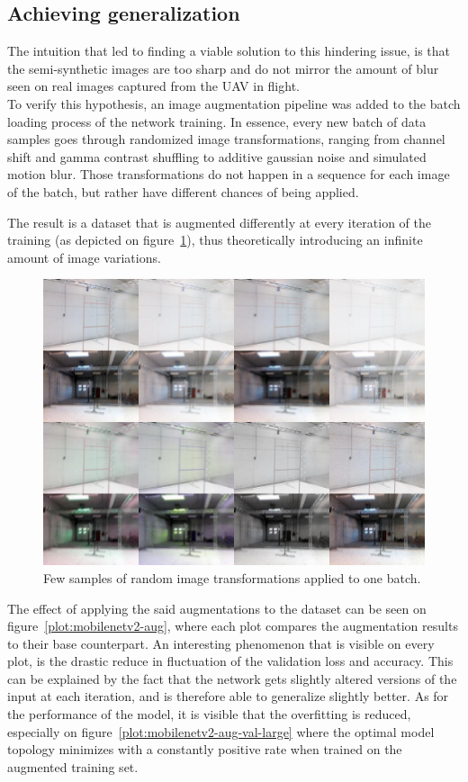 \subsection{Achieving generalization}

The intuition that led to finding a viable solution to this hindering issue, is
that the semi-synthetic images are too sharp and do not mirror the amount of
blur seen on real images captured from the UAV in flight.\\

To verify this hypothesis, an image augmentation pipeline was added to the
batch loading process of the network training. In essence, every new batch of
data samples goes through randomized image transformations, ranging from
channel shift and gamma contrast shuffling to additive gaussian noise and
simulated motion blur. Those transformations do not happen in a sequence for
each image of the batch, but rather have different chances of being applied.

The result is a dataset that is augmented differently at every iteration of the
training (as depicted on figure~\ref{fig:augmentation}), thus theoretically
introducing an infinite amount of image variations.

\begin{figure}[h]
	\centering
	\includegraphics[width=\textwidth]{figure/grid_aug6.jpg}
	\caption{Few samples of random image transformations applied to one batch.}
	\label{fig:augmentation}
\end{figure}

The effect of applying the said augmentations to the dataset can be seen on
figure~\ref{plot:mobilenetv2-aug}, where each plot compares the augmentation
results to their base counterpart. An interesting phenomenon that is visible on
every plot, is the drastic reduce in fluctuation of the validation loss and
accuracy. This can be explained by the fact that the network gets slightly
altered versions of the input at each iteration, and is therefore able to
generalize slightly better. As for the performance of the model, it is visible
that the overfitting is reduced, especially on
figure~\ref{plot:mobilenetv2-aug-val-large} where the optimal model topology
minimizes with a constantly positive rate when trained on the augmented
training set.\\

